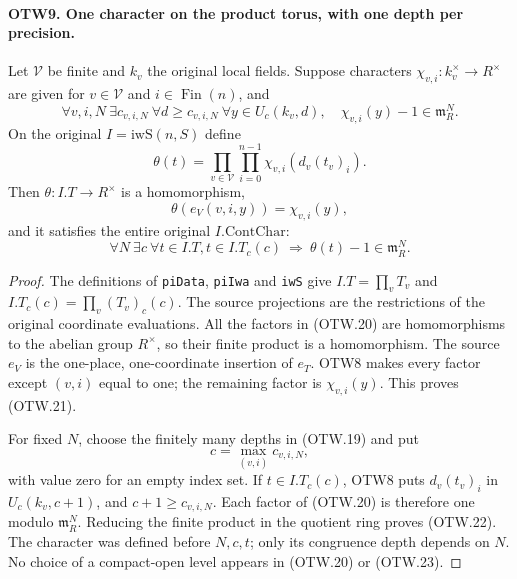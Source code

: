 \paragraph{OTW9. One character on the product torus, with one depth per precision.}
\label{claim:OTW9}
Let $\mathcal V$ be finite and $k_v$ the original local fields.
Suppose characters $\chi_{v,i}:k_v^\times\to R^\times$ are given
for $v\in\mathcal V$ and $i\in\operatorname{Fin}(n)$, and
\[
 \forall v,i,N\ \exists c_{v,i,N}\ \forall d\geq c_{v,i,N}
 \ \forall y\in U_c(k_v,d),\quad
                       \chi_{v,i}(y)-1\in\mathfrak m_R^N.
                       \tag{OTW.19}
\]
On the original $I=\mathrm{iwS}(n,S)$ define
\[
        \theta(t)=\prod_{v\in\mathcal V}\prod_{i=0}^{n-1}
                         \chi_{v,i}(d_v(t_v)_i).
                         \tag{OTW.20}
\]
Then $\theta:I.T\to R^\times$ is a homomorphism,
\[
                  \theta(e_V(v,i,y))=\chi_{v,i}(y),
                  \tag{OTW.21}
\]
and it satisfies the entire original $I.\mathrm{ContChar}$:
\[
 \forall N\ \exists c\ \forall t\in I.T,
             t\in I.T_c(c)\ \Longrightarrow\ \theta(t)-1\in\mathfrak m_R^N.
             \tag{OTW.22}
\]
\begin{proof}
The definitions of \texttt{piData}, \texttt{piIwa} and
\texttt{iwS} give $I.T=\prod_vT_v$ and
$I.T_c(c)=\prod_v(T_v)_c(c)$.  The source projections are
the restrictions of the original coordinate evaluations.
All the factors in (OTW.20) are homomorphisms to the abelian
group $R^\times$, so their finite product is a homomorphism.
The source $e_V$ is the one-place, one-coordinate insertion of
$e_T$.  OTW8 makes every factor except $(v,i)$ equal to one;
the remaining factor is $\chi_{v,i}(y)$.  This proves (OTW.21).

For fixed $N$, choose the finitely many depths in (OTW.19) and put
\[
                   c=\max_{(v,i)}c_{v,i,N},            \tag{OTW.23}
\]
with value zero for an empty index set.  If $t\in I.T_c(c)$,
OTW8 puts $d_v(t_v)_i$ in $U_c(k_v,c+1)$, and
$c+1\geq c_{v,i,N}$.  Each factor of (OTW.20) is therefore
one modulo $\mathfrak m_R^N$.  Reducing the finite product in
the quotient ring proves (OTW.22).
The character was defined before $N,c,t$; only its congruence
depth depends on $N$.  No choice of a compact-open level appears
in (OTW.20) or (OTW.23).
\end{proof}

